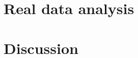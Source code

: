 \documentclass[11pt]{article}
\begin{document}
\section{Real data analysis}\label{sec:real}

\section{Discussion}\label{sec:discussion}



\appendix

\newpage
\end{document}
